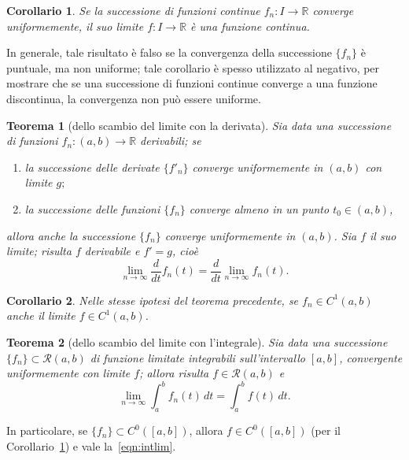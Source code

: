 \documentclass[a4paper]{book}
\numberwithin{equation}{section}
\theoremstyle{plain}
\newtheorem{teor}{Teorema}[section]
\newtheorem{cor}{Corollario}[section]
\theoremstyle{definition}
\theoremstyle{remark}
\theoremstyle{example}
\begin{document}
\begin{cor}
	\label{cor:contlim}
	Se la successione di funzioni continue $f_n \colon I \to \mathbb{R}$ converge uniformemente, il suo limite $f \colon I \to \mathbb{R}$ è una funzione continua.
\end{cor}

In generale, tale risultato è falso se la convergenza della successione $\{ f_n\}$ è puntuale, ma non uniforme; tale corollario è spesso utilizzato al negativo, per mostrare che se una successione di funzioni continue converge a una funzione discontinua, la convergenza non può essere uniforme.

\begin{teor}[dello scambio del limite con la derivata]
	\label{teor:limder}
	Sia data una successione di funzioni $f_n \colon (a, b) \to \mathbb{R}$ derivabili; se
		\begin{enumerate}
			\item la successione delle derivate $\{ f'_n\}$ converge uniformemente in $(a, b)$ con limite $g;$
			\item la successione delle funzioni $\{f_n \}$ converge almeno in un punto $t_0 \in (a, b)$,
		\end{enumerate}
	allora anche la successione $\{f_n\}$ converge uniformemente in $(a, b)$. Sia $f$ il suo limite; risulta $f$ derivabile e $f' = g$, cioè
		\begin{equation}
			\lim_{n \to \infty} \frac{d}{dt}f_n(t) = \frac{d}{dt} \lim_{n \to \infty} f_n(t).
		\end{equation}
\end{teor}

\begin{cor}
	Nelle stesse ipotesi del teorema precedente, se $f_n \in C^1(a, b)$ anche il limite $f \in C^1(a, b)$.
\end{cor}

\begin{teor}[dello scambio del limite con l'integrale]
	Sia data una successione $\{ f_n\} \subset \mathcal{R}(a, b)$ di funzione limitate integrabili sull'intervallo $[a, b]$, convergente uniformemente con limite $f$; allora risulta $f \in \mathcal{R}(a, b)$ e
	 	\begin{equation}
				\label{eqn:intlim}
			\lim_{n\to \infty} \int_a^b f_n(t)\,dt = \int_a^b f(t)\,dt.
		\end{equation}
\end{teor}

In particolare, se $\{f_n\} \subset C^0([a, b])$, allora $f \in C^0([a, b])$ (per il Corollario~\ref{cor:contlim}) e vale la~\eqref{eqn:intlim}.
\end{document}
